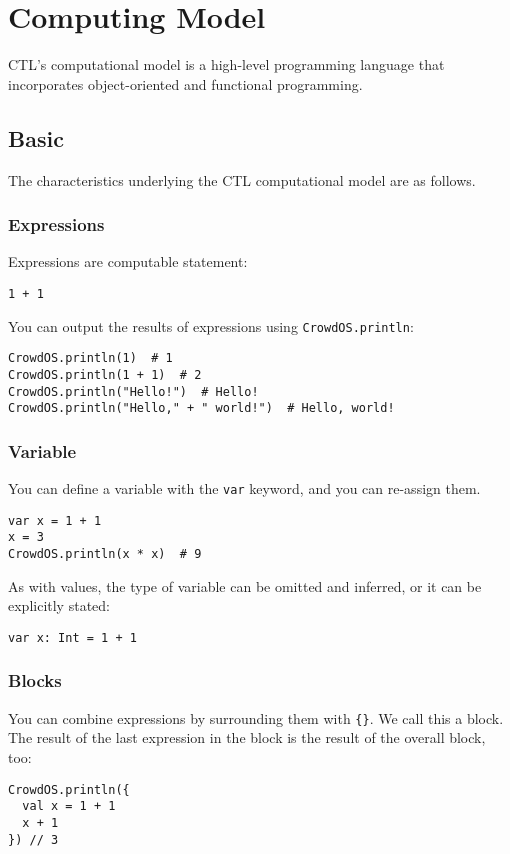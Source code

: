 \section{Computing Model}

CTL's computational model is a high-level programming language that incorporates object-oriented and functional programming.

\subsection{Basic}
The characteristics underlying the CTL computational model are as follows.
\subsubsection{Expressions}
Expressions are computable statement:
\begin{lstlisting}[numbers=none, xleftmargin=0.05\linewidth]
1 + 1
\end{lstlisting}
You can output the results of expressions using \texttt{CrowdOS.println}:
\begin{lstlisting}[numbers=none, xleftmargin=0.05\linewidth]
CrowdOS.println(1)  # 1
CrowdOS.println(1 + 1)  # 2
CrowdOS.println("Hello!")  # Hello!
CrowdOS.println("Hello," + " world!")  # Hello, world!   
\end{lstlisting}

\subsubsection{Variable}
You can define a variable with the \texttt{var} keyword, and you can re-assign them.
\begin{lstlisting}[numbers=none, xleftmargin=0.05\linewidth]
var x = 1 + 1
x = 3
CrowdOS.println(x * x)  # 9
\end{lstlisting}
As with values, the type of variable can be omitted and inferred, or it can be explicitly stated:
\begin{lstlisting}[numbers=none, xleftmargin=0.05\linewidth]
var x: Int = 1 + 1
\end{lstlisting}

\subsubsection{Blocks}
You can combine expressions by surrounding them with \texttt{\{\}}. We call this a block.
The result of the last expression in the block is the result of the overall block, too:
\begin{lstlisting}[numbers=none, xleftmargin=0.05\linewidth]
CrowdOS.println({
  val x = 1 + 1
  x + 1
}) // 3
\end{lstlisting}

